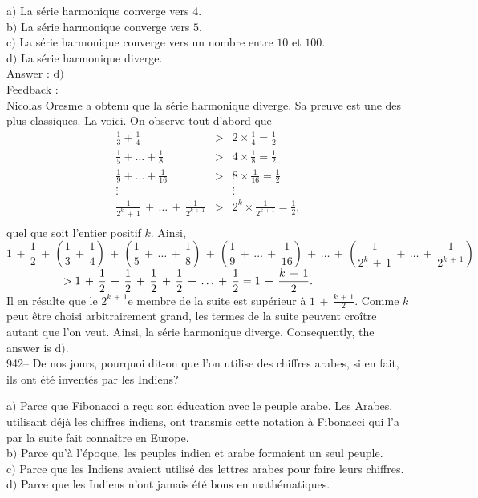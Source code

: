 ﻿\documentclass[letterpaper, 12pt]{article}
\begin{document}
a$)$ La s\'erie harmonique converge vers $4$. \\
b$)$ La s\'erie harmonique converge vers $5$. \\
c$)$ La s\'erie harmonique converge vers un nombre entre $10$ et $100$. \\
d$)$ La s\'erie harmonique diverge.\\

Answer : d$)$\\

Feedback :\\
Nicolas Oresme a obtenu que la s\'erie harmonique diverge. Sa preuve
est une des plus classiques. La voici. On observe tout d'abord que
$$\begin{array}{rcl}
\displaystyle{\frac13+\frac14}                      & > &
\displaystyle{2\times\frac14=\frac12} \\ [3mm]
\displaystyle{\frac15+\ldots+\frac18}               & > &
\displaystyle{4\times\frac18=\frac12} \\ [3mm]
\displaystyle{\frac19+\ldots+\frac1{16}}            & > &
\displaystyle{8\times\frac1{16}=\frac12} \\ [3mm] \vdots &   &
\vdots \\ [3 mm]
\displaystyle{\frac1{2^k\,+\,1}\,+\,\ldots\,+\,\frac1{2^{k\,+\,1}}}
& > & \displaystyle{2^k\times\frac1{2^{k\,+\,1}}=\frac12}, \\ [3mm]
\end{array}$$
quel que soit l'entier positif $k$. Ainsi,
$$\displaystyle{1\,+\,\frac12\,+\,\left(\frac13\,+\,\frac14\right)\,+\,\left(\frac15\,+\,\ldots\,+\,\frac18\right)\,+\,\left(\frac19\,+\,\ldots\,+\,\frac1{16}\right)\,+\,\ldots\,+\,
\left(\frac1{2^k\,+\,1}\,+\,\ldots\,+\,\frac1{2^{k\,+\,1}}\right)}$$
$\hskip 50 pt >
\displaystyle{1\,+\,\frac12\,+\,\frac12\,+\,\frac12\,+\,\frac12\,+\,\ldots\,+\,\frac12=1\,+\,\frac{k\,+\,1}2}.$\\[3mm]
Il en r\'esulte que le $2^{k\,+\,1}$e membre de la suite est
sup\'erieur \`a $1\,+\,\frac{k\,+\,1}2$. Comme $k$ peut \^etre
choisi arbitrairement grand,
les termes de la suite peuvent cro\^itre autant que l'on veut. Ainsi, la
s\'erie harmonique diverge. Consequently, the answer is d$)$.\\

942-- De nos jours, pourquoi dit-on que l'on utilise des chiffres
arabes, si en fait, ils ont \'et\'e invent\'es par les Indiens?

a$)$ Parce que Fibonacci a re\c cu son \'education avec le peuple
arabe. Les Arabes, utilisant d\'ej\`a les chiffres indiens, ont
transmis
cette notation \`a Fibonacci qui l'a par la suite fait conna\^itre en
Europe. \\
b$)$ Parce qu'\`a l'\'epoque, les peuples indien et arabe formaient un seul
peuple.  \\
c$)$ Parce que les Indiens avaient utilis\'e des lettres arabes pour faire
leurs chiffres. \\
d$)$ Parce que les Indiens n'ont jamais \'et\'e bons en math\'ematiques.\\
\end{document}
